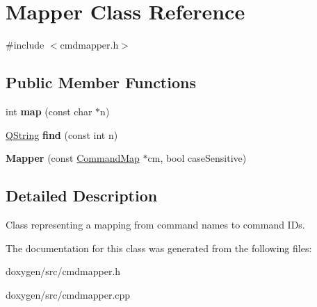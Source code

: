\hypertarget{class_mapper}{}\section{Mapper Class Reference}
\label{class_mapper}


{\ttfamily \#include $<$cmdmapper.\+h$>$}

\subsection*{Public Member Functions}
\begin{DoxyCompactItemize}
\item 
\mbox{\label{class_mapper_a5cafba463aa387c1d0ea9c300182a652}} 
int {\bfseries map} (const char $\ast$n)
\item 
\mbox{\label{class_mapper_af0fb3027903844fc052b8f683f85f455}} 
\mbox{\hyperlink{class_q_string}{Q\+String}} {\bfseries find} (const int n)
\item 
\mbox{\label{class_mapper_af3513047b2c3d6aedc2b429e6cdbc6b5}} 
{\bfseries Mapper} (const \mbox{\hyperlink{struct_command_map}{Command\+Map}} $\ast$cm, bool case\+Sensitive)
\end{DoxyCompactItemize}


\subsection{Detailed Description}
Class representing a mapping from command names to command I\+Ds. 

The documentation for this class was generated from the following files\+:\begin{DoxyCompactItemize}
\item 
doxygen/src/cmdmapper.\+h\item 
doxygen/src/cmdmapper.\+cpp\end{DoxyCompactItemize}
